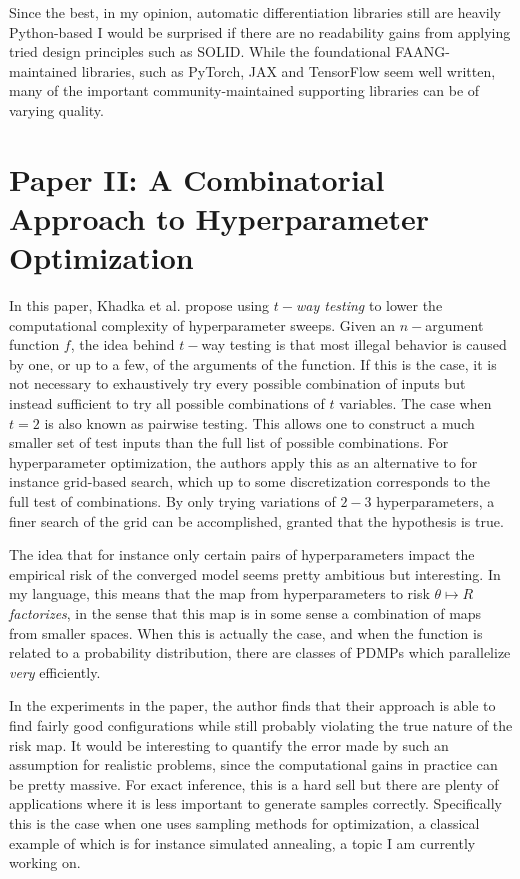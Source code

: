 \documentclass[11pt]{diazessay}
\begin{document}
Since the best, in my opinion, automatic differentiation libraries still are heavily Python-based I would be surprised if there are no readability gains from applying tried design principles such as SOLID. While the foundational FAANG-maintained libraries, such as PyTorch, JAX and TensorFlow seem well written, many of the important community-maintained supporting libraries can be of varying quality.

\section*{Paper II: A Combinatorial Approach to Hyperparameter Optimization\cite{khadka2024combinatorial}}

In this paper, Khadka et al. propose using \textit{$t-$way testing} to lower the computational complexity of hyperparameter sweeps. Given an $n-$argument function $f$, the idea behind $t-$way testing is that most illegal behavior is caused by one, or up to a few, of the arguments of the function. If this is the case, it is not necessary to exhaustively try every possible combination of inputs but instead sufficient to try all possible combinations of $t$ variables. The case when $t=2$ is also known as pairwise testing. This allows one to construct a much smaller set of test inputs than the full list of possible combinations. For hyperparameter optimization, the authors apply this as an alternative to for instance grid-based search, which up to some discretization corresponds to the full test of combinations. By only trying variations of $2-3$ hyperparameters, a finer search of the grid can be accomplished, granted that the hypothesis is true.

The idea that for instance only certain pairs of hyperparameters impact the empirical risk of the converged model seems pretty ambitious but interesting. In my language, this means that the map from hyperparameters to risk $\theta \mapsto R$ \textit{factorizes}, in the sense that this map is in some sense a combination of maps from smaller spaces. When this is actually the case, and when the function is related to a probability distribution, there are classes of PDMPs which parallelize \textit{very} efficiently.

In the experiments in the paper, the author finds that their approach is able to find fairly good configurations while still probably violating the true nature of the risk map. It would be interesting to quantify the error made by such an assumption for realistic problems, since the computational gains in practice can be pretty massive. For exact inference, this is a hard sell but there are plenty of applications where it is less important to generate samples correctly. Specifically this is the case when one uses sampling methods for optimization, a classical example of which is for instance simulated annealing\cite{chiang1987}, a topic I am currently working on.
\end{document}
